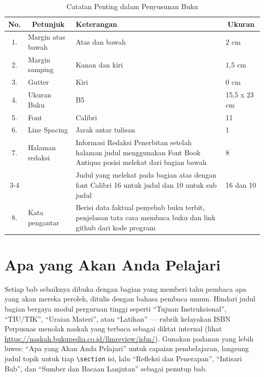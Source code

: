 \documentclass{bukupedia}
\begin{document}
\begin{table}[htbp]
  \centering
  \caption{Catatan Penting dalam Penyusunan Buku}
  \label{tab:catatan-buku}
  {\fontsize{8}{10}\selectfont
  \begin{tabularx}{\textwidth}{|c|l|X|l|}
    \hline
    \rowcolor{kepalatabel}
    \textbf{No.} & \multicolumn{1}{c|}{\textbf{Petunjuk}} &
    \textbf{Keterangan} & \multicolumn{1}{c|}{\textbf{Ukuran}} \\
    \hline
    1. & Margin atas bawah & Atas dan bawah & 2 cm \\ \hline
    2. & Margin samping    & Kanan dan kiri & 1,5 cm \\ \hline
    3. & Gutter            & Kiri           & 0 cm \\ \hline
    4. & Ukuran Buku       & B5             & 15,5 x 23 cm \\ \hline
    5. & Font              & Calibri        & 11 \\ \hline
    6. & Line Spacing      & Jarak antar tulisan & 1 \\ \hline
    7. & Halaman redaksi   & Informasi Redaksi Penerbitan setelah
         halaman judul menggunakan Font Book Antiqua posisi melekat
         dari bagian bawah & 8 \\ \cline{3-4}
       &                   & Judul yang melekat pada bagian atas dengan
         font Calibri 16 untuk judul dan 10 untuk sub judul & 16 dan 10 \\ \hline
    8. & Kata pengantar    & Berisi data faktual penyebab buku terbit,
         penjelasan tata cara membaca buku dan link github dari kode
         program & \\
    \hline
  \end{tabularx}}
\end{table}

\section{Apa yang Akan Anda Pelajari}
Setiap bab sebaiknya dibuka dengan bagian yang memberi tahu pembaca apa
yang akan mereka peroleh, ditulis dengan bahasa pembaca umum. Hindari
judul bagian bergaya modul perguruan tinggi seperti ``Tujuan
Instruksional'', ``TIU/TIK'', ``Uraian Materi'', atau ``Latihan'' ---
rubrik kelayakan ISBN Perpusnas menolak naskah yang terbaca
sebagai diktat internal (lihat
\url{https://naskah.bukupedia.co.id/llmreview/isbn/}). Gunakan padanan
yang lebih luwes: ``Apa yang Akan Anda Pelajari'' untuk capaian
pembelajaran, langsung judul topik untuk
tiap \verb|\section| isi, lalu ``Refleksi dan Penerapan'', ``Intisari
Bab'', dan ``Sumber dan Bacaan Lanjutan'' sebagai penutup bab.
\end{document}
